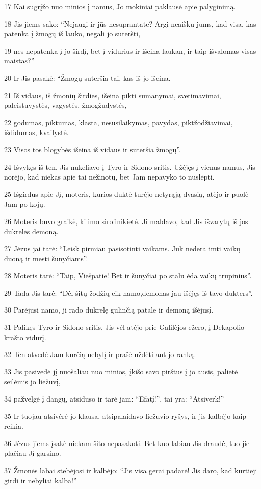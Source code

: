 \par 17 Kai sugrįžo nuo minios į namus, Jo mokiniai paklausė apie palyginimą. 
\par 18 Jis jiems sako: “Nejaugi ir jūs nesuprantate? Argi neaišku jums, kad visa, kas patenka į žmogų iš lauko, negali jo suteršti, 
\par 19 nes nepatenka į jo širdį, bet į vidurius ir išeina laukan, ir taip išvalomas visas maistas?” 
\par 20 Ir Jis pasakė: “Žmogų suteršia tai, kas iš jo išeina. 
\par 21 Iš vidaus, iš žmonių širdies, išeina pikti sumanymai, svetimavimai, paleistuvystės, vagystės, žmogžudystės, 
\par 22 godumas, piktumas, klasta, nesusilaikymas, pavydas, piktžodžiavimai, išdidumas, kvailystė. 
\par 23 Visos tos blogybės išeina iš vidaus ir suteršia žmogų”. 
\par 24 Išvykęs iš ten, Jis nukeliavo į Tyro ir Sidono sritis. Užėjęs į vienus namus, Jis norėjo, kad niekas apie tai nežinotų, bet Jam nepavyko to nuslėpti. 
\par 25 Išgirdus apie Jį, moteris, kurios duktė turėjo netyrąją dvasią, atėjo ir puolė Jam po kojų. 
\par 26 Moteris buvo graikė, kilimo sirofinikietė. Ji maldavo, kad Jis išvarytų iš jos dukrelės demoną. 
\par 27 Jėzus jai tarė: “Leisk pirmiau pasisotinti vaikams. Juk nedera imti vaikų duoną ir mesti šunyčiams”. 
\par 28 Moteris tarė: “Taip, Viešpatie! Bet ir šunyčiai po stalu ėda vaikų trupinius”. 
\par 29 Tada Jis tarė: “Dėl šitų žodžių eik namo,­demonas jau išėjęs iš tavo dukters”. 
\par 30 Parėjusi namo, ji rado dukrelę gulinčią patale ir demoną išėjusį. 
\par 31 Palikęs Tyro ir Sidono sritis, Jis vėl atėjo prie Galilėjos ežero, į Dekapolio krašto vidurį. 
\par 32 Ten atvedė Jam kurčią nebylį ir prašė uždėti ant jo ranką. 
\par 33 Jis pasivedė jį nuošaliau nuo minios, įkišo savo pirštus į jo ausis, palietė seilėmis jo liežuvį, 
\par 34 pažvelgė į dangų, atsiduso ir tarė jam: “Efatį!”, tai yra: “Atsiverk!” 
\par 35 Ir tuojau atsivėrė jo klausa, atsipalaidavo liežuvio ryšys, ir jis kalbėjo kaip reikia. 
\par 36 Jėzus jiems įsakė niekam šito nepasakoti. Bet kuo labiau Jis draudė, tuo jie plačiau Jį garsino. 
\par 37 Žmonės labai stebėjosi ir kalbėjo: “Jis visa gerai padarė! Jis daro, kad kurtieji girdi ir nebyliai kalba!”



